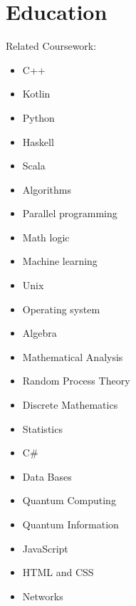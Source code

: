 \documentclass[11pt,a4paper,sans]{moderncv}        %
\begin{document}
	\vspace*{-1.05mm}
	\makecvtitle
	\vspace*{-10mm}
	
	\section{Education}
	{}{Related Coursework:}
	\vspace{-1.0em}\begin{small}
		\begin{multicols}{4}
			\begin{itemize}
				\item C++
				\item Kotlin
				\item Python
				\item Haskell
				\item Scala
				\item Algorithms
				\item Parallel programming
				\item Math logic
				\item Machine learning
				\item Unix
				\item Operating system
				\item Algebra
				\item Mathematical Analysis
				\item Random Process Theory
				\item Discrete Mathematics
				\item Statistics
				\item C\#
				\item Data Bases
				\item Quantum Computing
				\item Quantum Information
				\item JavaScript
				\item HTML and CSS
				\item Networks
			\end{itemize}
	\end{multicols}\end{small}
	
\end{document}
